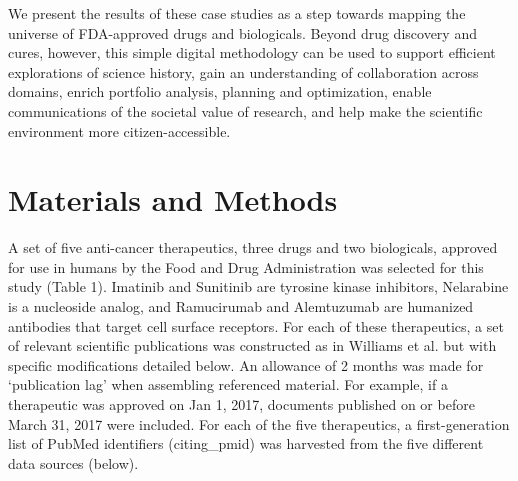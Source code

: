\documentclass[10pt,letterpaper]{article}
\begin{document}
We present the results of these case studies as a step towards mapping the universe of FDA-approved drugs and biologicals. Beyond drug discovery and cures, however, this simple digital methodology can be used to support efficient explorations of science history, gain an understanding of collaboration across domains, enrich portfolio analysis, planning and optimization, enable communications of the societal value of research, and help make the scientific environment more citizen-accessible. 

\section*{Materials and Methods} 
A set of five anti-cancer therapeutics, three drugs and two biologicals, approved for use in humans by the Food and Drug Administration was selected for this study (Table 1). Imatinib and Sunitinib are tyrosine kinase inhibitors, Nelarabine is a nucleoside analog, and Ramucirumab and Alemtuzumab are humanized antibodies that target cell surface receptors. 
 For each of these therapeutics, a set of relevant scientific publications was constructed as in Williams et al.\cite{bib1} but with specific modifications detailed below. An allowance of 2 months was made for `publication lag' when assembling referenced material. For example, if a therapeutic was approved on Jan 1, 2017, documents published  on or before March 31, 2017 were included. For each of the five therapeutics, a first-generation list of PubMed identifiers (citing\_pmid) was harvested from the five different data sources (below).  
\end{document}

